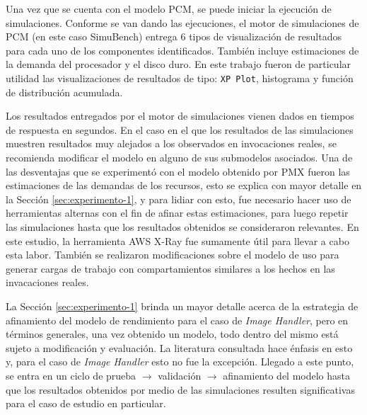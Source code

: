 Una vez que se cuenta con el modelo PCM, se puede iniciar la ejecución de simulaciones. Conforme se van dando las ejecuciones, el motor de simulaciones de PCM (en este caso SimuBench) entrega 6 tipos de visualización de resultados para cada uno de los componentes identificados. También incluye estimaciones de la demanda del procesador y el disco duro. En este trabajo fueron de particular utilidad las visualizaciones de resultados de tipo: \texttt{XP Plot}, histograma y función de distribución acumulada.

Los resultados entregados por el motor de simulaciones vienen dados en tiempos de respuesta en segundos. En el caso en el que los resultados de las simulaciones muestren resultados muy alejados a los observados en invocaciones reales, se recomienda modificar el modelo en alguno de sus submodelos asociados. Una de las desventajas que se experimentó con el modelo obtenido por PMX fueron las estimaciones de las demandas de los recursos, esto se explica con mayor detalle en la Sección \ref{sec:experimento-1}, y para lidiar con esto, fue necesario hacer uso de herramientas alternas con el fin de afinar estas estimaciones, para luego repetir las simulaciones hasta que los resultados obtenidos se consideraron relevantes. En este estudio, la herramienta AWS X-Ray fue sumamente útil para llevar a cabo esta labor. También se realizaron modificaciones sobre el modelo de uso para generar cargas de trabajo con compartamientos similares a los hechos en las invacaciones reales.

La Sección \ref{sec:experimento-1} brinda un mayor detalle acerca de la estrategia de afinamiento del modelo de rendimiento para el caso de \emph{Image Handler}, pero en términos generales, una vez obtenido un modelo, todo dentro del mismo está sujeto a modificación y evaluación. La literatura consultada hace énfasis en esto y, para el caso de \emph{Image Handler} esto no fue la excepción. Llegado a este punto, se entra en un ciclo de prueba $\rightarrow$ validación $\rightarrow$ afinamiento del modelo hasta que los resultados obtenidos por medio de las simulaciones resulten significativas para el caso de estudio en particular.

